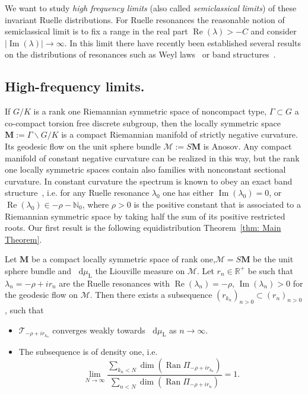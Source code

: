 \documentclass[AHL, Unicode, longabstracts, published]{cedram}
\DeclareMathOperator{\Imag}{Im}
\DeclareMathOperator{\Real}{Re}
\DeclareMathOperator{\Ran}{Ran}
\newcommand{\rml}{\mathrm{L}}
\let\Im=\Imag
\let\Re=\Real
\renewcommand{\Re}{\operatorname{Re}}
\renewcommand{\Im}{\operatorname{Im}}
\newcommand{\N}{\mathbb{N}}
\newcommand{\R}{\mathbb R}
\newcommand{\intd}{\mathop{}\!\mathrm{d}}
\begin{document}
We want to study \emph{high frequency limits} (also called \emph{semiclassical limits}) of these invariant Ruelle distributions. For Ruelle resonances the reasonable notion of semiclassical limit is to fix a range in the real part $\Real(\lambda)>-C$ and consider $|\Imag(\lambda)|\to\infty$. In this limit there have recently been established several results on the distributions of resonances such as Weyl laws~\cite{DDZ14,FSj11,FT17b} or band structures~\cite{FT13, FT17}.

\subsection{High-frequency limits.}
If $G/K$ is a rank one Riemannian symmetric space of noncompact type, $\Gamma\subset G$ a co-compact torsion free discrete subgroup, then the locally symmetric space $\mathbf M:= \Gamma\backslash G/K$ is a compact Riemannian manifold of strictly negative curvature. Its geodesic flow on the unit sphere bundle $\mathcal M:= S\mathbf M$ is Anosov. Any compact manifold of constant negative curvature can be realized in this way, but the rank one locally symmetric spaces contain also families with nonconstant sectional curvature. In constant curvature the spectrum is known to obey an exact band structure~\cite{DFG15, KW19a}, i.e. for any Ruelle resonance $\lambda_0$ one has either $\Imag(\lambda_0)=0$, or $\Real(\lambda_0) \in -\rho - \N_0$, where $\rho>0$ is the positive constant that is associated to a Riemannian symmetric space by taking half the sum of its positive restricted roots. Our first result is the following equidistribution Theorem~\ref{thm: Main Theorem}.

\begin{theo}\label{thm: Main Theorem}
Let $\mathbf M$ be a compact locally symmetric space of rank one,\linebreak	$\mathcal M=S\mathbf M$ be the unit sphere bundle and $\intd\mu_{\rml}$ the Liouville measure on $\mathcal M$. Let $r_n\in \R^+$ be such that $\lambda_n=-\rho+ir_n$ are the Ruelle resonances with $\Re(\lambda_n)=-\rho$, $\Im(\lambda_n)>0$ for the geodesic flow on $\mathcal M$. Then there exists a subsequence $(r_{k_n})_{n>0}\subset (r_n)_{n>0}$, such that
\begin{itemize}
\item $\mathcal T_{-\rho + ir_{k_n}}$ converges weakly towards $\intd \mu_{\rml}$ as $n\to\infty$.
\item The subsequence is of density one, i.e.
\[
\lim_{N\to\infty}\frac{\sum_{k_n<N} \dim(\Ran\Pi_{-\rho + ir_{k_n}})}{\sum_{n<N} \dim(\Ran\Pi_{-\rho + ir_n})}=1.
\]
\end{itemize}
\end{theo}
\end{document}

